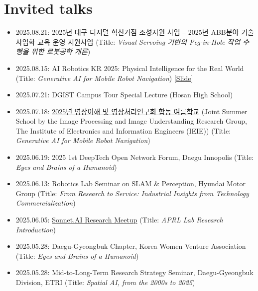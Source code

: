 \section{Invited talks}
\begin{itemize}[label=$\cdot$]
    \item 2025.08.21: \textsf{2025년 대구 디지털 혁신거점 조성지원 사업 -- 2025년 ABB분야 기술사업화 교육 운영 지원사업}   
    \hfill (Title: \textit{\textsf{Visual Servoing 기반의 Peg-in-Hole 작업 수행을 위한 로봇공학 개론}})
    
    \item 2025.08.15: AI Robotics KR 2025: Physical Intelligence for the Real World  
        \hfill (Title: \textit{Generative AI for Mobile Robot Navigation}) 
        \href{https://www.dropbox.com/scl/fi/mejiev0huoryn9gzls86j/20250815-Giseop-Kim-Generative-AI-for-Mobile-Robot-Navigation.pptx?rlkey=p76u5j7jikvp57nez8fktb9we&dl=0}{[Slide]}
            
    \item 2025.07.21: DGIST Campus Tour Special Lecture (Hosan High School)   
    
    \item 2025.07.18: \href{https://www.theieie.org/events/?part=03&c_id=949}{\textsf{2025년 영상이해 및 영상처리연구회 합동 여름학교}} (Joint Summer School by the Image Processing and Image Understanding Research Group, The Institute of Electronics and Information Engineers (IEIE))  
        \hfill (Title: \textit{Generative AI for Mobile Robot Navigation})
    
    \item 2025.06.19: 2025 1st DeepTech Open Network Forum, Daegu Innopolis  
    \hfill (Title: \textit{Eyes and Brains of a Humanoid})
    
    \item 2025.06.13: Robotics Lab Seminar on SLAM \& Perception, Hyundai Motor Group  
    \hfill (Title: \textit{From Research to Service: Industrial Insights from Technology Commercialization})
    
    \item 2025.06.05: \href{https://sonnet.ai}{Sonnet.AI Research Meetup}  
    \hfill (Title: \textit{APRL Lab Research Introduction})
        
    \item 2025.05.28: Daegu-Gyeongbuk Chapter, Korea Women Venture Association  
    \hfill (Title: \textit{Eyes and Brains of a Humanoid})
    
    \item 2025.05.28: Mid-to-Long-Term Research Strategy Seminar, Daegu-Gyeongbuk Division, ETRI  
    \hfill (Title: \textit{Spatial AI, from the 2000s to 2025})
    

\end{itemize}
